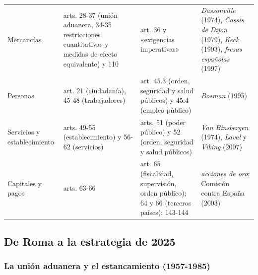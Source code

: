 \documentclass[11pt]{article}
\begin{document}
\begin{anotaciones}
\begin{tablacaja}
\begin{tabular}{>{\raggedright\arraybackslash}p{2.4cm}>{\raggedright\arraybackslash}p{3.2cm}>{\raggedright\arraybackslash}p{3.5cm}>{\raggedright\arraybackslash}p{4.3cm}}
\hline
Mercancías & arts. 28-37 (unión aduanera, 34-35 restricciones cuantitativas y medidas de efecto equivalente) y 110 & art. 36 y «exigencias imperativas» & \emph{Dassonville} (1974), \emph{Cassis de Dijon} (1979), \emph{Keck} (1993), \emph{fresas españolas} (1997)\\
Personas & art. 21 (ciudadanía), 45-48 (trabajadores) & art. 45.3 (orden, seguridad y salud públicos) y 45.4 (empleo público) & \emph{Bosman} (1995)\\
Servicios y establecimiento & arts. 49-55 (establecimiento) y 56-62 (servicios) & arts. 51 (poder público) y 52 (orden, seguridad y salud públicos) & \emph{Van Binsbergen} (1974), \emph{Laval} y \emph{Viking} (2007)\\
Capitales y pagos & arts. 63-66 & art. 65 (fiscalidad, supervisión, orden público); 64 y 66 (terceros países); 143-144 & \emph{acciones de oro}: Comisión contra España (2003)\\
\hline
\end{tabular}
\end{tablacaja}
\end{anotaciones}

\subsection{De Roma a la estrategia de 2025}\label{sec:historia}

\subsubsection{La unión aduanera y el estancamiento (1957-1985)}\label{sec:union-aduanera}
\end{document}

